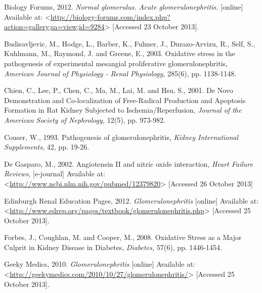 \documentclass[11pt]{report}
\begin{document}
Biology Forums, 2012. \textit{Normal glomerulus. Acute glomerulonephritis.} [online] Available at: <\url{http://biology-forums.com/index.php?action=gallery;sa=view;id=9284}> [Accessed 23 October 2013].
\newline
\newline

Budisavljevic, M., Hodge, L., Barber, K., Fulmer, J., Durazo-Arvizu, R., Self, S., Kuhlmann, M., Raymond, J. and Greene, E., 2003. Oxidative stress in the pathogenesis of experimental mesangial proliferative glomerulonephritis, \textit{American Journal of Physiology - Renal Physiology,} 285(6), pp. 1138-1148.
\newline
\newline

Chien, C., Lee, P., Chen, C., Ma, M., Lai, M. and Hsu, S., 2001. De Novo Demonstration and Co-localization of Free-Radical Production and Apoptosis Formation in Rat Kidney Subjected to Ischemia/Reperfusion, \textit{Journal of the American Society of Nephrology,} 12(5), pp. 973-982.
\newline
\newline

Couser, W., 1993. Pathogenesis of glomerulonephritis, \textit{Kidney International Supplements,} 42, pp. 19-26.
\newline
\newline

De Gasparo, M., 2002. Angiotensin II and nitric oxide interaction, \textit{Heart Failure Reviews,} [e-journal] Available at:<\url{http://www.ncbi.nlm.nih.gov/pubmed/12379820}> [Accessed 26 October 2013]
\newline
\newline

Edinburgh Renal Education Pages, 2012. \textit{Glomerulonephritis} [online] Available at: <\url{http://www.edrep.org/pages/textbook/glomerulonephritis.php}> [Accessed 25 October 2013].
\newline
\newline

Forbes, J., Coughlan, M. and Cooper, M., 2008. Oxidative Stress as a Major Culprit in Kidney Disease in Diabetes, \textit{Diabetes,} 57(6), pp. 1446-1454.
\newline
\newline

Geeky Medics, 2010. \textit{Glomerulonephritis} [online] Available at: <\url{http://geekymedics.com/2010/10/27/glomerulonephritis/}> [Accessed 25 October 2013].
\newline
\newline
\end{document}
